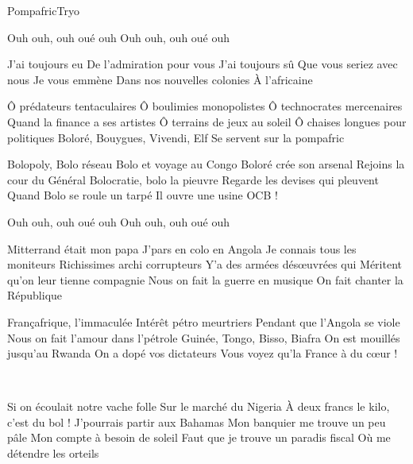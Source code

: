 \begin{Song}{Pompafric}{Tryo}
\begin{multicols}{2}

\begin{Verse}
Ouh ouh, ouh oué ouh
Ouh ouh, ouh oué ouh
\end{Verse}
\espaceInterStrophe

\begin{Chorus}
J'ai toujours eu
De l'admiration pour vous
J'ai toujours sû
Que vous seriez avec nous
Je vous emmène
Dans nos nouvelles colonies
\`A l'africaine
\end{Chorus}
\espaceInterStrophe

\begin{Verse}
Ô prédateurs tentaculaires
Ô boulimies monopolistes
Ô technocrates mercenaires
Quand la finance a ses artistes
Ô terrains de jeux au soleil
Ô chaises longues pour politiques
Boloré, Bouygues, Vivendi, Elf
Se servent sur la pompafric
\espaceInterStrophe

Bolopoly, Bolo réseau
Bolo et voyage au Congo
Boloré crée son arsenal
Rejoins la cour du Général
Bolocratie, bolo la pieuvre
Regarde les devises qui pleuvent
Quand Bolo se roule un tarpé
Il ouvre une usine OCB !
\end{Verse}
\espaceInterStrophe

\aurefrain
\espaceInterStrophe

\begin{Verse}
Ouh ouh, ouh oué ouh
Ouh ouh, ouh oué ouh
\bis
\vfill
\columnbreak

Mitterrand était mon papa
J'pars en colo en Angola
Je connais tous les moniteurs
Richissimes archi corrupteurs
Y'a des armées dés\oe uvrées qui
Méritent qu'on leur tienne compagnie
Nous on fait la guerre en musique
On fait chanter la République
\espaceInterStrophe

Françafrique, l'immaculée
Intérêt pétro meurtriers
Pendant que l'Angola se viole
Nous on fait l'amour dans l'pétrole
Guinée, Tongo, Bisso, Biafra
On est mouillés jusqu'au Rwanda
On a dopé vos dictateurs
Vous voyez qu'la France à du c\oe ur !
\end{Verse}
\espaceInterStrophe

\aurefrain\\
\espaceInterStrophe

\begin{Verse}
Si on écoulait notre vache folle
Sur le marché du Nigeria
\`A deux francs le kilo, c'est du bol !
J'pourrais partir aux Bahamas
Mon banquier me trouve un peu pâle
Mon compte à besoin de soleil
Faut que je trouve un paradis fiscal
Où me détendre les orteils
\espaceInterStrophe


\end{Verse}
\end{multicols}
\end{Song}
